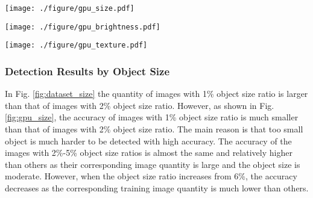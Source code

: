 \documentclass[10pt,journal,compsoc]{IEEEtran}
\begin{document}
\begin{figure*}
\vspace{-6pt}
  \texttt{[image: ./figure/gpu\_size.pdf]}
  \vspace{-20pt}
  \caption{Detection accuracy of GPU entries with respect to size.}
    \vspace{-1pt}
  \label{fig:gpu_size}
  \vspace{-10pt}
\end{figure*}


\begin{figure*}
  \texttt{[image: ./figure/gpu\_brightness.pdf]}
  \vspace{-20pt}
  \caption{Detection accuracy of GPU entries with respect to brightness.}
    \vspace{-1pt}
  \label{fig:gpu_brightness}
  \vspace{-16pt}
\end{figure*}

\begin{figure*}
  \texttt{[image: ./figure/gpu\_texture.pdf]}
  \vspace{-20pt}
  \caption{Detection accuracy of GPU entries with respect to amount of information.}
    \vspace{-1pt}
  \label{fig:gpu_texture}
  \vspace{-16pt}
\end{figure*}


\subsubsection{Detection Results by Object Size}\label{gpu_size}

In Fig. \ref{fig:dataset_size} the quantity of images with 1\% object size ratio is larger than that of images with 2\% object size ratio.
However, as shown in Fig. \ref{fig:gpu_size}, the accuracy of images with 1\% object size ratio is much smaller than that of images with 2\% object size ratio.
The main reason is that too small object is much harder to be detected with high accuracy.
The accuracy of the images with 2\%-5\% object size ratios is almost the same and relatively higher than others as their corresponding image quantity is large and the object size is moderate.
However, when the object size ratio increases from 6\%, the accuracy decreases as the corresponding training image quantity is much lower than others.
\end{document}
